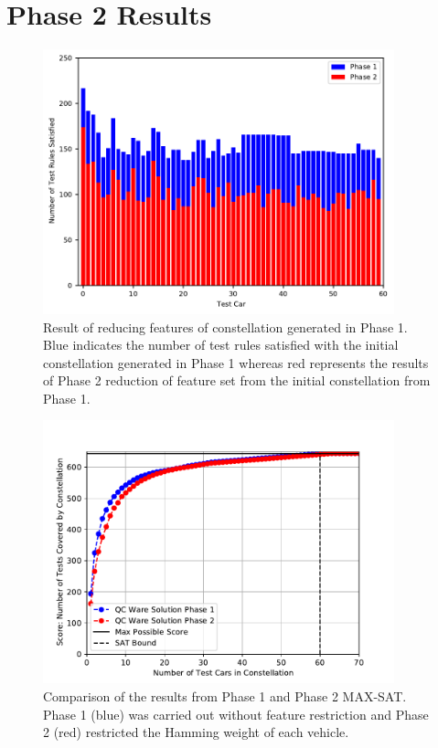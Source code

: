 \documentclass[aps,pra,twocolumn,superscriptaddress,groupedaddress]{revtex4}  %
\begin{document}
\section{Phase 2 Results}

\begin{figure}[ht]
\begin{center}
\includegraphics[width=4in]{figures/phase2/6-reduce-rules.pdf}
\caption{Result of reducing features of constellation generated in Phase 1.
         Blue indicates the number of test rules satisfied with the initial constellation
         generated in Phase 1 whereas red represents the results of Phase 2 reduction of
         feature set from the initial constellation from Phase 1.}
\label{fig:6-reduce}
\end{center}
\end{figure}

\begin{figure}[ht]
\begin{center}
\includegraphics[width=4in]{figures/phase2/2p-score.pdf}
\caption{Comparison of the results from Phase 1 and Phase 2 MAX-SAT. Phase 1 (blue) was
         carried out without feature restriction and Phase 2 (red) restricted the Hamming
         weight of each vehicle.}
\label{fig:solution2}
\end{center}
\end{figure}
\end{document}
